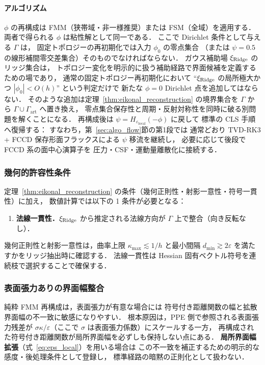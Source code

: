 \paragraph{アルゴリズム}
$\phi$ の再構成は FMM（狭帯域・非一様推奨）または FSM（全域）を適用する．
両者で得られる $\phi$ は粘性解として同一である．
ここで Dirichlet 条件として与える $\Gamma$ は，
固定トポロジーの再初期化では入力 $\phi_0$ の零点集合
（または $\psi=0.5$ の線形補間零交差集合）そのものでなければならない．
ガウス補助場 $\xi_{\text{Ridge}}$ のリッジ集合は，
トポロジー変化を明示的に扱う補助経路で界面候補を定義するための場であり，
通常の固定トポロジー再初期化において
``$\xi_{\text{Ridge}}$ の局所極大かつ $|\phi_0|<O(h)$'' という判定だけで
新たな $\phi=0$ Dirichlet 点を追加してはならない．
そのような追加は定理~\ref{thm:eikonal_reconstruction} の境界集合を
$\Gamma$ から $\Gamma\cup\Gamma_{\mathrm{art}}$ へ置き換え，
零点集合保存性と周期・反射対称性を同時に破る別問題を解くことになる．
再構成後は $\psi = H_{\varepsilon_\text{local}}(-\phi)$ に戻して
標準の CLS 手順へ復帰する：
すなわち，第~\ref{sec:algo_flow}節の第1段では
通常どおり TVD-RK3 + FCCD 保存形面フラックスによる $\psi$ 移流を継続し，
必要に応じて後段で FCCD 系の面中心演算子を
圧力・CSF・運動量離散化に接続する．

\subsubsection{幾何的許容性条件}
\label{sec:ridge_admissibility}

定理~\ref{thm:eikonal_reconstruction} の条件（幾何正則性・射影一意性・符号一貫性）に加え，
数値計算では以下の 1 条件が必要となる：
\begin{enumerate}
  \item\textbf{法線一貫性．}$\xi_{\text{Ridge}}$ から推定される法線方向が $\Gamma$ 上で整合（向き反転なし）．
\end{enumerate}
幾何正則性と射影一意性は，曲率上限 $\kappa_{\max}\lesssim 1/h$ と最小間隔
$d_{\min}\gtrsim 2\varepsilon$ を満たすかをリッジ抽出時に確認する．
法線一貫性は Hessian 固有ベクトル符号を連続枝で選択することで確保する．

\subsubsection{表面張力ありの界面幅整合}

純粋 FMM 再構成は，表面張力が有意な場合には
符号付き距離関数の幅と拡散界面幅の不一致に敏感になりやすい．
根本原因は，PPE 側で参照される表面張力残差が
$\sigma\kappa/\varepsilon$（ここで $\sigma$ は表面張力係数）にスケールする一方，
再構成された符号付き距離関数が局所界面幅を必ずしも保持しない点にある．
\textbf{局所界面幅拡張}（式~\eqref{eq:eps_local}）を用いる場合は
この不一致を補正するための明示的な感度・後処理条件として登録し，
標準経路の暗黙の正則化として扱わない．

